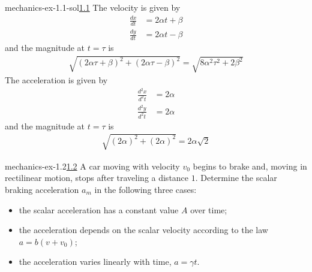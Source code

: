 \documentclass[preview]{standalone}
\begin{document}
\begin{snippetsolution}{mechanics-ex-1.1-sol}{\underline{1.1}}
    The velocity is given by
    \begin{align*}
        \frac{dx}{dt} &= 2\alpha t + \beta \\
        \frac{dy}{dt} &= 2\alpha t - \beta
    \end{align*}
    and the magnitude at \(t=\tau\) is
    \begin{align*}
        \sqrt{{(2\alpha\tau + \beta)}^2 + {(2\alpha\tau - \beta)}^2}
        = \sqrt{8\alpha^2\tau^2 + 2\beta^2}
    \end{align*}
    The acceleration is given by
    \begin{align*}
        \frac{d^2x}{d^2t} &= 2\alpha \\
        \frac{d^2y}{d^2t} &= 2\alpha
    \end{align*}
    and the magnitude at \(t=\tau\) is
    \begin{align*}
        \sqrt{{(2\alpha)}^2 + {(2\alpha)}^2} = 2\alpha\sqrt{2}
    \end{align*}
\end{snippetsolution}

\begin{snippetexercise}{mechanics-ex-1.2}{\underline{1.2}}
    A car moving with velocity \(v_0\) begins to brake and, moving in rectilinear motion, stops after traveling a distance \(1\).
    Determine the scalar braking acceleration \(a_m\) in the following three cases:
    \begin{itemize}
        \item the scalar acceleration has a constant value \(A\) over time;
        \item the acceleration depends on the scalar velocity according to the law \(a = b(v + v_0)\);
        \item the acceleration varies linearly with time, \(a = \gamma t\).
    \end{itemize}
\end{snippetexercise}
\end{document}
